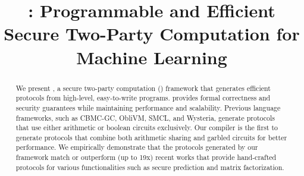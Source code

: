 \documentclass[conference]{IEEEtran}
\begin{document}
\title{\tool: Programmable and Efficient Secure Two-Party Computation for Machine Learning}




\maketitle

\begin{abstract}
We present \tool, a 
secure two-party computation (\mpc) framework that generates efficient
\mpc protocols from high-level, easy-to-write programs.
\tool provides formal correctness and security guarantees while maintaining performance and scalability.
Previous language frameworks, such as CBMC-GC, ObliVM, SMCL, and
Wysteria,
generate protocols that use either arithmetic or boolean
circuits exclusively. Our compiler is the first to generate protocols
that combine both arithmetic sharing and garbled circuits  for better
performance.
We
empirically demonstrate that the
protocols generated by our framework match or outperform (up to
19x)
recent works that provide hand-crafted protocols for various
functionalities such as secure  prediction  and matrix factorization.

\end{abstract}


\graphicspath{{./Images/}}


%
%

















%
%

\appendix

%



%
\end{document}
